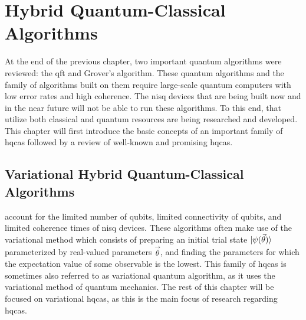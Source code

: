 \chapter[Hybrid Quantum-Classical Algorithms]{Hybrid Quantum-Classical\\Algorithms} \label{chap:hybrid-quantum-classical-algorithms}
At the end of the previous chapter, two important quantum algorithms were reviewed: the \gls{qft} and Grover's algorithm.
These quantum algorithms and the family of algorithms built on them require large-scale quantum computers with low error rates and high coherence.
The \gls{nisq} devices that are being built now and in the near future will not be able to run these algorithms.
To this end,  that utilize both classical and quantum resources are being researched and developed.
This chapter will first introduce the basic concepts of an important family of \glspl{hqca} followed by a review of well-known and promising \glspl{hqca}.

\section{Variational Hybrid Quantum-Classical Algorithms}
 account for the limited number of qubits, limited connectivity of qubits, and limited coherence times of \gls{nisq} devices.
These algorithms often make use of the variational method which consists of preparing an initial trial state $\vert{\psi(\vec{\theta})}\rangle$ parameterized by real-valued parameters $\vec{\theta}$, and finding the parameters for which the expectation value of some observable is the lowest.
This family of \glspl{hqca} is sometimes also referred to as variational quantum algorithm, as it uses the variational method of quantum mechanics.
The rest of this chapter will be focused on variational \glspl{hqca}, as this is the main focus of research regarding \glspl{hqca}.

